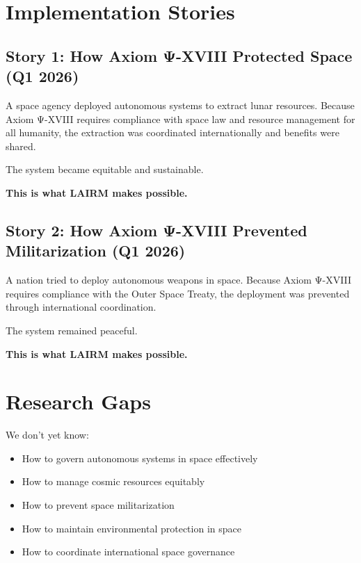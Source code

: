 \vspace{0.5cm}

\section{Implementation Stories}

\subsection{Story 1: How Axiom Ψ-XVIII Protected Space (Q1 2026)}

A space agency deployed autonomous systems to extract lunar resources. Because Axiom Ψ-XVIII requires compliance with space law and resource management for all humanity, the extraction was coordinated internationally and benefits were shared.

The system became equitable and sustainable.

\textbf{This is what LAIRM makes possible.}

\subsection{Story 2: How Axiom Ψ-XVIII Prevented Militarization (Q1 2026)}

A nation tried to deploy autonomous weapons in space. Because Axiom Ψ-XVIII requires compliance with the Outer Space Treaty, the deployment was prevented through international coordination.

The system remained peaceful.

\textbf{This is what LAIRM makes possible.}

\vspace{0.5cm}

\section{Research Gaps}

We don't yet know:

\begin{itemize}
    \item How to govern autonomous systems in space effectively
    
    \item How to manage cosmic resources equitably
    
    \item How to prevent space militarization
    
    \item How to maintain environmental protection in space
    
    \item How to coordinate international space governance
\end{itemize}

